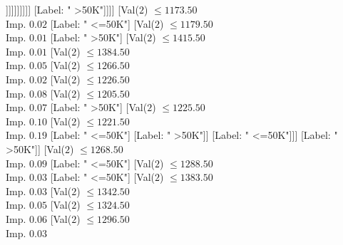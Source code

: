 \documentclass[margin=10pt]{standalone}
\begin{document}
\begin{forest}
																															[Label: " >50K"]
																															[Val($2$) $ \leq 1085.50$ \\ Imp. $0.01$
																																[Label: " >50K"]
																																[Val($2$) $ \leq 1100.50$ \\ Imp. $0.15$
																																	[Label: " >50K"]
																																	[Val($2$) $ \leq 1101.50$ \\ Imp. $0.32$
																																		[Label: " <=50K"]
																																		[Label: " >50K"]]]]]]]]]]
																									[Label: " >50K"]]]]
																						[Val($2$) $ \leq 1173.50$ \\ Imp. $0.02$
																							[Label: " <=50K"]
																							[Val($2$) $ \leq 1179.50$ \\ Imp. $0.01$
																								[Label: " >50K"]
																								[Val($2$) $ \leq 1415.50$ \\ Imp. $0.01$
																									[Val($2$) $ \leq 1384.50$ \\ Imp. $0.05$
																										[Val($2$) $ \leq 1266.50$ \\ Imp. $0.02$
																											[Val($2$) $ \leq 1226.50$ \\ Imp. $0.08$
																												[Val($2$) $ \leq 1205.50$ \\ Imp. $0.07$
																													[Label: " >50K"]
																													[Val($2$) $ \leq 1225.50$ \\ Imp. $0.10$
																														[Val($2$) $ \leq 1221.50$ \\ Imp. $0.19$
																															[Label: " <=50K"]
																															[Label: " >50K"]]
																														[Label: " <=50K"]]]
																												[Label: " >50K"]]
																											[Val($2$) $ \leq 1268.50$ \\ Imp. $0.09$
																												[Label: " <=50K"]
																												[Val($2$) $ \leq 1288.50$ \\ Imp. $0.03$
																													[Label: " <=50K"]
																													[Val($2$) $ \leq 1383.50$ \\ Imp. $0.03$
																														[Val($2$) $ \leq 1342.50$ \\ Imp. $0.05$
																															[Val($2$) $ \leq 1324.50$ \\ Imp. $0.06$
																																[Val($2$) $ \leq 1296.50$ \\ Imp. $0.03$

\end{forest}
\end{document}
